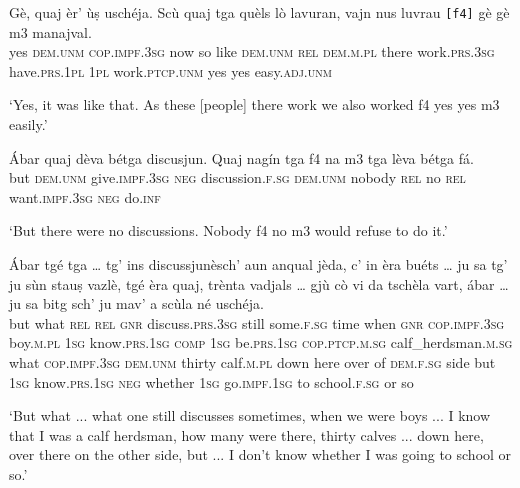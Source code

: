 \begin{linenumbers}
	\gll Gè, quaj èr’ ùṣ uschéja. Scù quaj tga quèls lò lavuran, vajn nus luvrau \texttt{[f4]} gè gè {\ob}m3{\cb} manajval.   \\
yes \textsc{dem.unm} \textsc{cop.impf.3sg} now so like \textsc{dem.unm} \textsc{rel} \textsc{dem.m.pl} there work.\textsc{prs.3sg} have\textsc{.prs.1pl} \textsc{1pl} work.\textsc{ptcp.unm} {} yes yes {} easy.\textsc{adj.unm}	\\
\end{linenumbers}
\medskip
\glt `Yes, it was like that. As these [people] there work we also worked {\ob}f4{\cb} yes yes {\ob}m3{\cb} easily.'
\medskip

\begin{linenumbers}
	\gll Ábar quaj dèva bétga discusjun. Quaj nagín tga {\ob}f4{\cb} na {\ob}m3{\cb} tga lèva bétga fá.\\
	but \textsc{dem.unm} give.\textsc{impf.3sg} \textsc{neg} discussion.\textsc{f.sg} \textsc{dem.unm} nobody \textsc{rel} {} no {} \textsc{rel} want.\textsc{impf.3sg} \textsc{neg} do.\textsc{inf}\\
\end{linenumbers}
\medskip
\glt `But there were no discussions. Nobody {\ob}f4{\cb} no {\ob}m3{\cb} would refuse to do it.'
\medskip

\begin{linenumbers}
	\gll Ábar tgé tga … tg’ ins discussjunèsch’ aun anqual jèda, c’ in èra buéts … ju sa tg’ ju sùn stauṣ vazlè, tgé èra quaj, trènta vadjals … gjù cò vi da tschèla vart, ábar … ju sa bitg  sch’ ju mav’ a scùla né uschéja.   \\
	but what \textsc{rel} {} \textsc{rel} \textsc{gnr} discuss.\textsc{prs.3sg} still some.\textsc{f.sg} time when \textsc{gnr} \textsc{cop.impf.3sg} boy.\textsc{m.pl} {} \textsc{1sg} know.\textsc{prs.1sg} \textsc{comp} \textsc{1sg} be.\textsc{prs.1sg} \textsc{cop.ptcp.m.sg} calf\_herdsman.\textsc{m.sg} what \textsc{cop.impf.3sg} \textsc{dem.unm} thirty calf.\textsc{m.pl} {} down here over of \textsc{dem.f.sg} side but {} \textsc{1sg} know.\textsc{prs.1sg} \textsc{neg} whether \textsc{1sg} go.\textsc{impf.1sg} to school.\textsc{f.sg} or so \\
\end{linenumbers}
\medskip
\glt `But what ... what one still discusses sometimes, when we were boys ... I know that I was a calf herdsman, how many were there, thirty calves ... down here, over there on the other side, but ... I don't know whether I was going to school or so.'
\medskip

